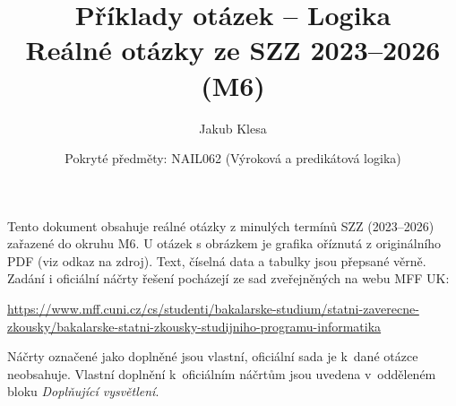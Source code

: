 \documentclass[11pt,a4paper]{article}
\title{Příklady otázek -- Logika\\[0.3em]\large Reálné otázky ze SZZ 2023--2026 (M6)}
\author{Jakub Klesa}
\date{Pokryté předměty: NAIL062 (Výroková a predikátová logika)}
\begin{document}
\maketitle
\tableofcontents
\bigskip

\begin{poznamka}
Tento dokument obsahuje reálné otázky z minulých termínů SZZ (2023--2026) zařazené do
okruhu M6. U otázek s obrázkem je grafika oříznutá z originálního PDF (viz odkaz na
zdroj). Text, číselná data a tabulky jsou přepsané věrně.
Zadání i oficiální náčrty řešení pocházejí ze sad zveřejněných na webu MFF UK:\par
{\raggedright\url{https://www.mff.cuni.cz/cs/studenti/bakalarske-studium/statni-zaverecne-zkousky/bakalarske-statni-zkousky-studijniho-programu-informatika}\par}
Náčrty označené jako doplněné jsou vlastní, oficiální sada je k~dané otázce neobsahuje.
Vlastní doplnění k~oficiálním náčrtům jsou uvedena v~odděleném bloku \emph{Doplňující vysvětlení}.
\end{poznamka}
\bigskip


\end{document}
